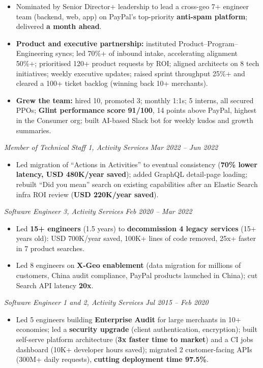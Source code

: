 \documentclass[10pt,a4paper]{article}
\newcommand{\bd}[1]{\textbf{#1}}
\newcommand{\role}[2]{%
  \par\vspace{2pt}\noindent\textcolor{rolecolor}{\textit{#1}}\hfill
  \textcolor{rolecolor}{\textit{#2}}\par\nopagebreak}
\begin{document}
\begin{itemize}
  calls/day, freeing 1k+ VMs across PayPal.
\item Nominated by Senior Director+ leadership to lead a cross-geo 7+ engineer team (backend,
  web, app) on PayPal's top-priority \bd{anti-spam platform}; delivered \bd{a month ahead}.
\item \bd{Product and executive partnership:} instituted Product--Program--Engineering syncs;
  led 70\%+ of inbound intake, accelerating alignment 50\%+; prioritised 120+ product requests by
  ROI; aligned architects on 8 tech initiatives; weekly executive updates; raised sprint
  throughput 25\%+ and cleared a 100+ ticket backlog (winning back 10+ merchants).
\item \bd{Grew the team:} hired 10, promoted 3; monthly 1:1s; 5 interns, all secured PPOs;
  \bd{Glint performance score 91/100}, 14 points above PayPal, highest in the Consumer
  org; built AI-based Slack bot for weekly kudos and growth summaries.
\end{itemize}

\role{Member of Technical Staff 1, Activity Services}{Mar 2022 -- Jun 2022}
\begin{itemize}
\item Led migration of ``Actions in Activities'' to eventual consistency (\bd{70\% lower
  latency, USD 480K/year saved}); added GraphQL detail-page loading; rebuilt
  ``Did you mean'' search on existing capabilities after an Elastic Search infra ROI review
  (\bd{USD 220K/year saved}).
\end{itemize}

\role{Software Engineer 3, Activity Services}{Feb 2020 -- Mar 2022}
\begin{itemize}
\item Led \bd{15+ engineers} (1.5 years) to \bd{decommission 4 legacy services} (15+ years old):
  USD 700K/year saved, 100K+ lines of code removed, 25x+ faster in 7 product searches.
\item Led 8 engineers on \bd{X-Geo enablement} (data migration for millions of customers, China
  audit compliance, PayPal products launched in China); cut Search API latency \bd{20x}.
\end{itemize}

\role{Software Engineer 1 and 2, Activity Services}{Jul 2015 -- Feb 2020}
\begin{itemize}
\item Led 5 engineers building \bd{Enterprise Audit} for large merchants in 10+ economies; led a
  \bd{security upgrade} (client authentication, encryption); built self-serve platform
  architecture (\bd{3x faster time to market}) and a CI jobs dashboard (10K+ developer hours
  saved); migrated 2 customer-facing APIs (300M+ daily requests), \bd{cutting deployment time
  97.5\%}.
\end{itemize}
\end{document}
